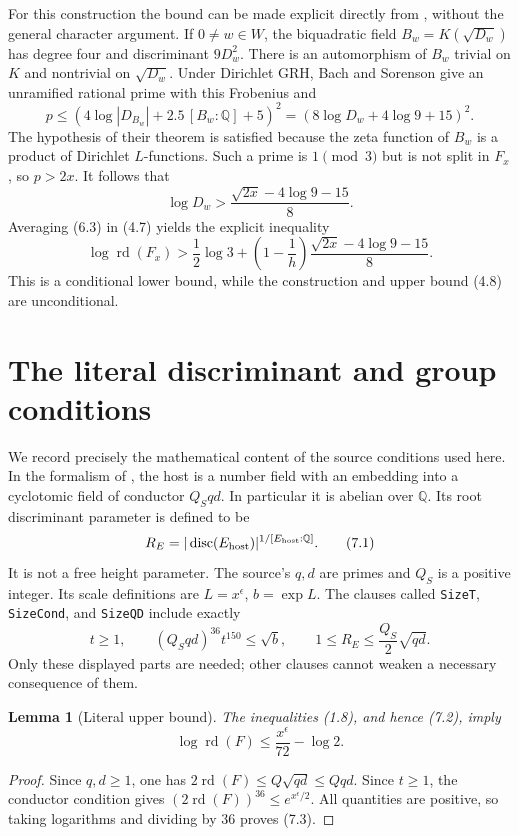 \documentclass[11pt]{article}
\newtheorem{lemma}[theorem]{Lemma}
\theoremstyle{remark}\newtheorem{remark}[theorem]{Remark}
\newcommand{\Q}{\mathbb Q}
\newcommand{\rd}{\operatorname{rd}}
\begin{document}
For this construction the bound can be made explicit directly from
\citet[Theorem~5.1, p.~1729]{BachSorenson1996}, without the general
character argument. If $0\ne w\in W$, the biquadratic field
$B_w=K(\sqrt{D_w})$ has degree four and discriminant
$9D_w^2$. There is an automorphism of $B_w$ trivial on $K$ and
nontrivial on $\sqrt{D_w}$. Under Dirichlet GRH, Bach and
Sorenson give an unramified rational prime with this Frobenius and
\[
 p\le(4\log|D_{B_w}|+2.5\,[B_w:\Q]+5)^2
       =(8\log D_w+4\log9+15)^2.
                                                        \tag{6.2}
\]
The hypothesis of their theorem is satisfied because the zeta
function of $B_w$ is a product of Dirichlet $L$-functions.
Such a prime is $1\pmod3$ but is not split in $F_x$, so $p>2x$.
It follows that
\[
 \log D_w>\frac{\sqrt{2x}-4\log9-15}{8}.
                                                        \tag{6.3}
\]
Averaging (6.3) in (4.7) yields the explicit inequality
\[
 \log\rd(F_x)>\frac12\log3+
       \left(1-\frac1h\right)
       \frac{\sqrt{2x}-4\log9-15}{8}.
                                                        \tag{6.4}
\]
This is a conditional lower bound, while the construction and
upper bound (4.8) are unconditional.

\section{The literal discriminant and group conditions}

We record precisely the mathematical content of the source
conditions used here. In the formalism of \citet{AlpogeLean2026},
the host is a number field with an embedding into a cyclotomic
field of conductor $Q_Sqd$. In particular it is abelian over $\Q$.
Its root discriminant parameter is defined to be
\[
       R_E=|\operatorname{disc}(E_{\mathrm{host}})|^%
                              {1/[E_{\mathrm{host}}:\Q]}.
                                                        \tag{7.1}
\]
It is not a free height parameter. The source's $q,d$ are primes
and $Q_S$ is a positive integer. Its scale definitions are
$L=x^\epsilon$, $b=\exp L$. The clauses called
\texttt{SizeT}, \texttt{SizeCond}, and \texttt{SizeQD} include
exactly
\[
 t\ge1,\qquad (Q_Sqd)^{36}t^{150}\le\sqrt b,
 \qquad 1\le R_E\le\frac{Q_S}{2}\sqrt{qd}.
                                                        \tag{7.2}
\]
Only these displayed parts are needed; other clauses cannot
weaken a necessary consequence of them.

\begin{lemma}[Literal upper bound]\label{lem:upper}
The inequalities (1.8), and hence (7.2), imply
\[
                  \log\rd(F)\le\frac{x^\epsilon}{72}-\log2.
                                                        \tag{7.3}
\]
\end{lemma}
\begin{proof}
Since $q,d\ge1$, one has $2\rd(F)\le Q\sqrt{qd}\le Qqd$.
Since $t\ge1$, the conductor condition gives
$(2\rd(F))^{36}\le e^{x^\epsilon/2}$. All quantities are
positive, so taking logarithms and dividing by $36$ proves (7.3).
\end{proof}
\end{document}
